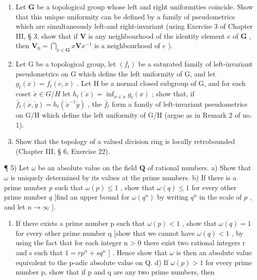 \begin{enumerate}
\def\labelenumi{\arabic{enumi})}
\setcounter{enumi}{1}
\item
  Let \(\mathbf{G}\) be a topological group whose left and right uniformities coincide. Show that this unique uniformity can be defined by a family of pseudometrics which are simultaneously left-and right-invariant (using Exercise 3 of Chapter III, § 3, show that if \(\mathbf{V}\) is any neighbourhood of the identity element \(e\) of \(\mathbf{G}\) , then \(\mathbf{V}_0 = \bigcap_{x\in \mathbf{G}}x\mathbf{V}x^{-1}\) is a neighbourhood of \(e\) ).
\item
  Let G be a topological group, let \((f_{t})\) be a saturated family of left-invariant pseudometrics on G which define the left uniformity of G, and let \(g_{t}(x)=f_{t}(e,x)\) . Let H be a normal closed subgroup of G, and for each coset \(\dot{x}\in G/H\) let \(h_{t}(\dot{x})=\inf_{x\in \dot{x}}g_{t}(x)\) ; show that, if \(\bar{f}_{t}(\dot{x},\dot{y})=h_{t}(\dot{x}^{-1}\dot{y})\) , the \(\bar{f}_{t}\) form a family of left-invariant pseudometrics on G/H which define the left uniformity of G/H (argue as in Remark 2 of no. 1).
\item
  Show that the topology of a valued division ring is locally retrobounded (Chapter III, § 6, Exercise 22).
\end{enumerate}

¶ 5) Let \(\omega\) be an absolute value on the field \(\mathbf{Q}\) of rational numbers. a) Show that \(\omega\) is uniquely determined by its values at the prime numbers. b) If there is a prime number \(p\) such that \(\omega(p) \leqslant 1\) , show that \(\omega(q) \leqslant 1\) for every other prime number \(q\) {[}find an upper bound for \(\omega(q^n)\) by writing \(q^n\) in the scale of \(p\) , and let \(n \to \infty\) {]}.

\begin{enumerate}
\def\labelenumi{\alph{enumi})}
\setcounter{enumi}{2}
\tightlist
\item
  If there exists a prime number p such that \(\omega(p) < 1\) , show that \(\omega(q) = 1\) for every other prime number q {[}show that we cannot have \(\omega(q) < 1\) , by using the fact that for each integer n \textgreater{} 0 there exist two rational integers r and s such that \(1 = rp^{n} + sq^{n}\) {]} . Hence show that \(\omega\) is then an absolute value equivalent to the p-adic absolute value on Q. d) If \(\omega(p) > 1\) for every prime number p, show that if p and q are any two prime numbers, then
\end{enumerate}

